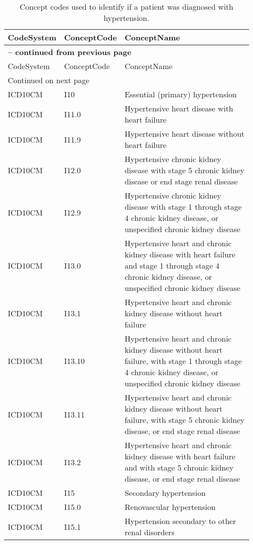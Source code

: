\begin{longtable}{p{}p{}p{}}
\caption{Concept codes used to identify if a patient was diagnosed with hypertension.} \\ 
 CodeSystem & ConceptCode & ConceptName \\ 
  \hline 
\endfirsthead 
\multicolumn{3}{p{\textwidth}}{{ \bfseries \tablename \thetable{} -- continued from previous page}} \\ 
\hline CodeSystem & ConceptCode & ConceptName \\ \hline 
\endhead 
\hline \multicolumn{3}{p{\textwidth}}{{Continued on next page}} \\ \hline 
\endfoot 
\hline 
\endlastfoot 
 \hline
ICD10CM & I10 & Essential (primary) hypertension \\ 
  ICD10CM & I11.0 & Hypertensive heart disease with heart failure \\ 
  ICD10CM & I11.9 & Hypertensive heart disease without heart failure \\ 
  ICD10CM & I12.0 & Hypertensive chronic kidney disease with stage 5 chronic kidney disease or end stage renal disease \\ 
  ICD10CM & I12.9 & Hypertensive chronic kidney disease with stage 1 through stage 4 chronic kidney disease, or unspecified chronic kidney disease \\ 
  ICD10CM & I13.0 & Hypertensive heart and chronic kidney disease with heart failure and stage 1 through stage 4 chronic kidney disease, or unspecified chronic kidney disease \\ 
  ICD10CM & I13.1 & Hypertensive heart and chronic kidney disease without heart failure \\ 
  ICD10CM & I13.10 & Hypertensive heart and chronic kidney disease without heart failure, with stage 1 through stage 4 chronic kidney disease, or unspecified chronic kidney disease \\ 
  ICD10CM & I13.11 & Hypertensive heart and chronic kidney disease without heart failure, with stage 5 chronic kidney disease, or end stage renal disease \\ 
  ICD10CM & I13.2 & Hypertensive heart and chronic kidney disease with heart failure and with stage 5 chronic kidney disease, or end stage renal disease \\ 
  ICD10CM & I15 & Secondary hypertension \\ 
  ICD10CM & I15.0 & Renovascular hypertension \\ 
  ICD10CM & I15.1 & Hypertension secondary to other renal disorders \\ 

\end{longtable}
